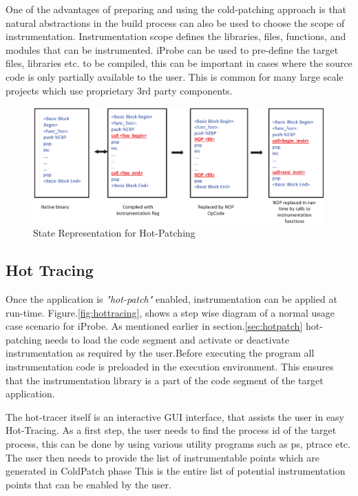 One of the advantages of preparing and using the cold-patching approach is that natural abstractions in the build process can also be used to choose the scope of instrumentation. Instrumentation scope defines the libraries, files, functions, and modules that can be instrumented. iProbe can be used to pre-define the target files, libraries etc. to be compiled, this can be important in cases where the source code is only partially available to the user. This is common for many large scale projects which use proprietary 3rd party components.


\begin{figure}[htb]
  \begin{center}
    \includegraphics[totalheight=6cm]
    {Images/state-diagram.eps}
    \caption{State Representation for Hot-Patching}
    \label{fig:state_rep}
  \end{center}
\end{figure}

\subsection{Hot Tracing}
\label{sec:hottracing}

Once the application is \textit{"hot-patch"} enabled, instrumentation can be applied at run-time. Figure.\ref{fig:hottracing}, shows a step wise diagram of a normal usage case scenario for iProbe. As mentioned earlier in section.\ref{sec:hotpatch} hot-patching needs to load the code segment and activate or deactivate instrumentation as required by the user.Before executing the program all instrumentation code is preloaded in the execution environment. This ensures that the instrumentation library is a part of the code segment of the target application.

The hot-tracer itself is an interactive GUI interface, that assists the user in easy Hot-Tracing. As a first step, the user needs to find the process id of the target process, this can be done by using various utility programs such as ps, ptrace etc. The user then needs to provide the list of instrumentable points which are generated in ColdPatch phase This is the entire list of potential instrumentation points that can be enabled by the user. 


